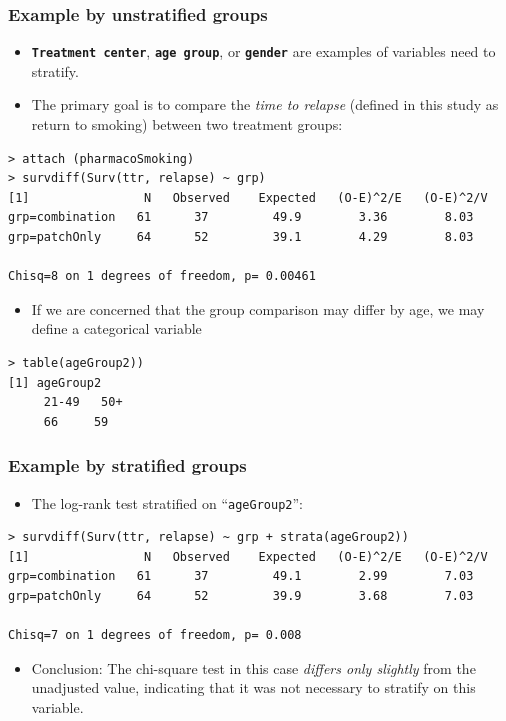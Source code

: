 \documentclass{beamer}
\newcommand{\empr}[1]{{\emph{\color{red}#1}}}
\newcommand{\pkg}[1]{{\textbf{\texttt{#1}}}}
\begin{document}
\pagebreak
\begin{frame}[fragile]
\frametitle{Example by unstratified groups}
\begin{itemize}
\item \pkg{Treatment center}, \pkg{age group}, or \pkg{gender} are examples of variables need to stratify.
\item The primary goal is to compare the \empr{time to relapse} (defined in this study as return to smoking) between two treatment groups:
\end{itemize}
\begin{Verbatim}
> attach (pharmacoSmoking)
> survdiff(Surv(ttr, relapse) ~ grp)
[1]                N   Observed    Expected   (O-E)^2/E   (O-E)^2/V
grp=combination   61      37         49.9        3.36        8.03
grp=patchOnly     64      52         39.1        4.29        8.03

Chisq=8 on 1 degrees of freedom, p= 0.00461
\end{Verbatim}
\begin{itemize}
\item If we are concerned that the group comparison may differ by age, we may define a categorical variable
\end{itemize}
\begin{Verbatim}
> table(ageGroup2))
[1] ageGroup2
     21-49   50+
     66     59
\end{Verbatim}
\end{frame}

\pagebreak
\begin{frame}[fragile]
\frametitle{Example by stratified groups}
\begin{itemize}
\item The log-rank test stratified on ``\texttt{ageGroup2}'':
\end{itemize}
\begin{Verbatim}
> survdiff(Surv(ttr, relapse) ~ grp + strata(ageGroup2))
[1]                N   Observed    Expected   (O-E)^2/E   (O-E)^2/V
grp=combination   61      37         49.1        2.99        7.03
grp=patchOnly     64      52         39.9        3.68        7.03

Chisq=7 on 1 degrees of freedom, p= 0.008
\end{Verbatim}
\begin{itemize}
\item Conclusion: The chi-square test in this case \empr{differs only slightly} from the unadjusted value, indicating that it was not necessary to stratify on this variable.
\end{itemize}
\end{frame}
\end{document}
